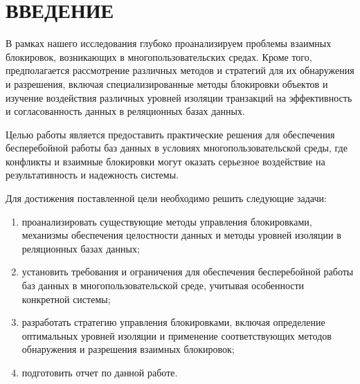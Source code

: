 \chapter*{\hfill{\centering ВВЕДЕНИЕ}\hfill}

В рамках нашего исследования глубоко проанализируем проблемы взаимных блокировок, возникающих в многопользовательских средах. 
Кроме того, предполагается рассмотрение различных методов и стратегий для их обнаружения и разрешения, включая специализированные методы блокировки объектов и изучение воздействия различных уровней изоляции транзакций на эффективность и согласованность данных в реляционных базах данных.

Целью работы является предоставить практические решения для обеспечения бесперебойной работы баз данных в условиях многопользовательской среды, где конфликты и взаимные блокировки могут оказать серьезное воздействие на результативность и надежность системы.

Для достижения поставленной цели необходимо решить следующие задачи:

\begin{enumerate}[label={\arabic*)}]
	\item проанализировать существующие методы управления блокировками, механизмы обеспечения целостности данных и методы уровней изоляции в реляционных базах данных;
	\item установить требования и ограничения для обеспечения бесперебойной работы баз данных в многопользовательской среде, учитывая особенности конкретной системы;
	\item разработать стратегию управления блокировками, включая определение оптимальных уровней изоляции и применение соответствующих методов обнаружения и разрешения взаимных блокировок;
	\item подготовить отчет по данной работе.
\end{enumerate}
